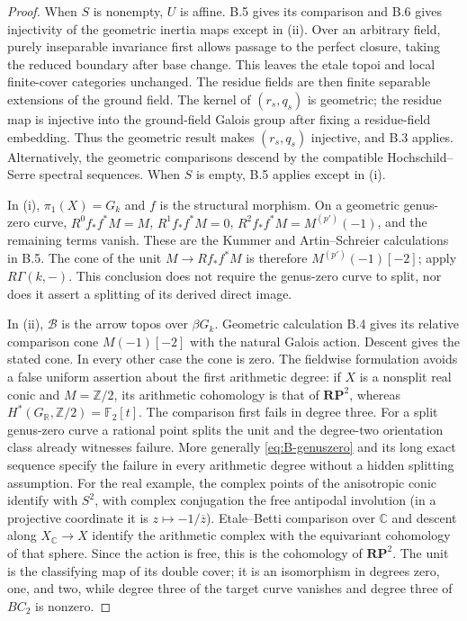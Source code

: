 \begin{proof}
When $S$ is nonempty, $U$ is affine. B.5 gives its comparison and
B.6 gives injectivity of the geometric inertia maps except in
(ii). Over an arbitrary field, purely inseparable invariance first
allows passage to the perfect closure, taking the reduced boundary
after base change. This leaves the etale topoi and local finite-cover
categories unchanged. The residue fields are then finite separable
extensions of the ground field. The kernel of $(r_s,q_s)$ is
geometric; the residue map is injective into the ground-field
Galois group after fixing a residue-field embedding. Thus the
geometric result makes $(r_s,q_s)$ injective, and B.3 applies.
Alternatively, the geometric comparisons descend by the
compatible Hochschild--Serre spectral sequences. When $S$ is
empty, B.5 applies except in (i).

In (i), $\pi_1(X)=G_k$ and $f$ is the structural morphism.
On a geometric genus-zero curve, $R^0f_*f^*M=M$,
$R^1f_*f^*M=0$, $R^2f_*f^*M=M^{(p')}(-1)$, and the remaining
terms vanish. These are the Kummer and Artin--Schreier calculations
in B.5. The cone of the unit $M\to Rf_*f^*M$ is therefore
$M^{(p')}(-1)[-2]$; apply $R\Gamma(k,-)$. This conclusion does
not require the genus-zero curve to split, nor does it assert a
splitting of its derived direct image.

In (ii), $\mathcal B$ is the arrow topos over $\beta G_k$.
Geometric calculation B.4 gives its relative comparison cone
$M(-1)[-2]$ with the natural Galois action. Descent gives the
stated cone. In every other case the cone is zero. The fieldwise
formulation avoids a false uniform assertion about the first
arithmetic degree: if $X$ is a nonsplit real conic and $M=\mathbb
Z/2$, its arithmetic cohomology is that of $\mathbf{RP}^2$,
whereas $H^*(G_{\mathbb R},\mathbb Z/2)=\mathbb F_2[t]$.
The comparison first fails in degree three. For a split genus-zero
curve a rational point splits the unit and the degree-two
orientation class already witnesses failure. More generally
\eqref{eq:B-genuszero} and its long exact sequence specify the
failure in every arithmetic degree without a hidden splitting
assumption.
For the real example, the complex points of the anisotropic
conic identify with $S^2$, with complex conjugation the free
antipodal involution (in a projective coordinate it is
$z\mapsto-1/\overline z$). Etale--Betti comparison over
$\mathbb C$ and descent along $X_{\mathbb C}\to X$ identify
the arithmetic complex with the equivariant cohomology
of that sphere. Since the action is free, this is the
cohomology of $\mathbf{RP}^2$. The unit is the classifying
map of its double cover; it is an isomorphism in degrees
zero, one, and two, while degree three of the target
curve vanishes and degree three of $BC_2$ is nonzero.
\end{proof}

